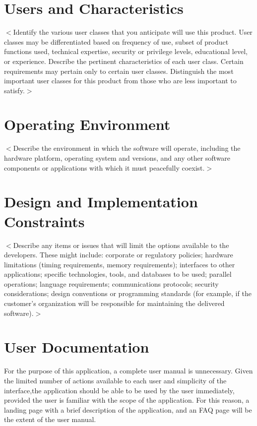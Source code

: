 \documentclass{scrreprt}
\begin{document}
\section{Users and Characteristics}
$<$Identify the various user classes that you anticipate will use this product.
User classes may be differentiated based on frequency of use, subset of product
functions used, technical expertise, security or privilege levels, educational
level, or experience. Describe the pertinent characteristics of each user class.
Certain requirements may pertain only to certain user classes. Distinguish the
most important user classes for this product from those who are less important
to satisfy.$>$

\section{Operating Environment}
$<$Describe the environment in which the software will operate, including the
hardware platform, operating system and versions, and any other software
components or applications with which it must peacefully coexist.$>$

\section{Design and Implementation Constraints}
$<$Describe any items or issues that will limit the options available to the
developers. These might include: corporate or regulatory policies; hardware
limitations (timing requirements, memory requirements); interfaces to other
applications; specific technologies, tools, and databases to be used; parallel
operations; language requirements; communications protocols; security
considerations; design conventions or programming standards (for example, if the
customer’s organization will be responsible for maintaining the delivered
software).$>$

\section{User Documentation}
For the purpose of this application, a complete user manual is unnecessary. Given the limited number of actions available to each user and simplicity of the interface,the application should be able to be used by the user immediately, provided the user is familiar with the scope of the application. For this reason, a landing page with a brief description of the application, and an FAQ page will be the extent of the user manual.
\end{document}
